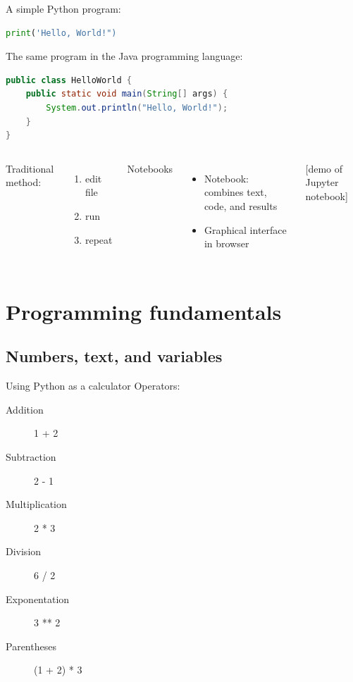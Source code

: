 \documentclass[aspectratio=169,usenames,dvipsnames]{beamer}
\begin{document}
\begin{frame}[fragile]
A simple Python program:
\begin{lstlisting}[language=python]
print('Hello, World!")
\end{lstlisting}

\pause
\vspace{1em}
The same program in the Java programming language:

\begin{lstlisting}[language=java]
public class HelloWorld {
    public static void main(String[] args) {
        System.out.println("Hello, World!");
    }
}
\end{lstlisting}
\end{frame}


\begin{frame}
	\begin{columns}
			Traditional method:
			\begin{enumerate}
				\item edit file
				\item run
				\item repeat
			\end{enumerate}
			Notebooks
			\begin{itemize}
				\item Notebook: combines text, code, and results
				\item Graphical interface in browser
			\end{itemize}
			[demo of Jupyter notebook]
	\end{columns}
\end{frame}



\section{Programming fundamentals}
\subsection{Numbers, text, and variables}
\frame{\tableofcontents[currentsection]}

\begin{frame}[fragile]{Using Python as a calculator}
Operators:
    \begin{description}
        \item[Addition] 1 + 2
        \item[Subtraction] 2 - 1
        \item[Multiplication] 2 * 3
        \item[Division] 6 / 2
        \item[Exponentation] 3 ** 2
        \item[Parentheses] (1 + 2) * 3
    \end{description}
\end{frame}
\end{document}
